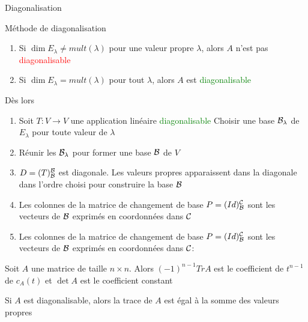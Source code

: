 \begin{parag}{Diagonalisation}
\begin{subparag}{Méthode de diagonalisation}
\begin{enumerate}
            \item Si $\dim E_\lambda \neq mult(\lambda)$ pour une valeur propre $\lambda$, alors $A$ n'est pas \textcolor{red}{diagonalisable}
            \item Si $\dim E_\lambda = mult(\lambda)$ pour tout $\lambda$, alors $A$ est \textcolor{green}{diagonalisable}
        \end{enumerate}
        Dès lors
        \begin{enumerate}
            \item Soit $T: V \to V$ une application linéaire \textcolor{green}{diagonalisable}
            Choisir une base $\mathcal{B}_\lambda$ de $E_\lambda$ pour toute valeur de $\lambda$
            \item Réunir les $\mathcal{B}_\lambda$ pour former une base $\mathcal{B}$ de $V$
            \item $D = (T)_{\mathcal{B}}^{\mathcal{B}}$ est diagonale. Les valeurs propres apparaissent dans la diagonale dans l'ordre choisi pour construire la base $\mathcal{B}$
            \item Les colonnes de la matrice de changement de base $P = (Id)_{\mathcal{B}}^{\mathcal{C}}$ sont les vecteurs de $\mathcal{B}$ exprimés en coordonnées dans $\mathcal{C}$
            \item Les colonnes de la matrice de changement de base $P = (Id)_{\mathcal{B}}^{\mathcal{C}}$ sont les vecteurs de $\mathcal{B}$ exprimés en coordonnées dans $\mathcal{C}$:
        \end{enumerate}
    \end{subparag}
    \begin{truc}
        Soit $A$ une matrice de taille $n \times n$. Alors $(-1)^{n-1}TrA$ est le coefficient de $t^{n-1}$ de $c_A(t)$ et $\det A$ est le coefficient constant
    \end{truc}
    \begin{truc}
        Si $A$ est diagonalisable, alors la trace de $A$ est égal à la somme des valeurs propres
    \end{truc}
\end{parag}

